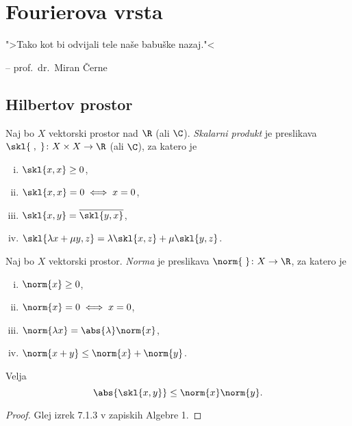 \section{Fourierova vrsta}

\epigraph{">Tako kot bi odvijali tele naše babuške nazaj."<}
{-- prof.~dr.~Miran Černe}

\subsection{Hilbertov prostor}


\begin{definicija}
Naj bo $X$ vektorski prostor nad $\R$ (ali $\C$).
\emph{Skalarni produkt} je preslikava
$\skl{\;,\;} \colon X \times X \to \R$ (ali $\C$), za katero je

\begin{enumerate}[i)]
\item $\skl{x,x} \geq 0$,
\item $\skl{x,x} = 0 \iff x = 0$,
\item $\skl{x,y} = \overline{\skl{y,x}}$,
\item $\skl{\lambda x + \mu y, z} =
\lambda \skl{x,z} + \mu \skl{y,z}$.
\end{enumerate}
\end{definicija}

\begin{definicija}
Naj bo $X$ vektorski prostor. \emph{Norma} je
preslikava $\norm{\;} \colon X \to \R$, za katero je

\begin{enumerate}[i)]
\item $\norm{x} \geq 0$,
\item $\norm{x} = 0 \iff x = 0$,
\item $\norm{\lambda x} = \abs{\lambda} \norm{x}$,
\item $\norm{x+y} \leq \norm{x} + \norm{y}$.
\end{enumerate}
\end{definicija}

\begin{izrek}
Velja
\[
\abs{\skl{x,y}} \leq \norm{x} \norm{y}.%
\]
\end{izrek}

\begin{proof}
Glej izrek 7.1.3 v zapiskih Algebre 1.
\end{proof}

